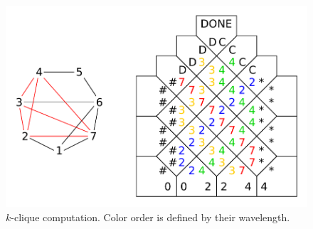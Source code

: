 \begin{figure}[H]
\begin{center}
	\includegraphics[scale=0.75]{./figures/k-clique/k-clique.pdf}
	\caption{$k$-clique computation. Color order is defined by their wavelength.}
	\label{fig:graph_iso}
\end{center}
\end{figure}

